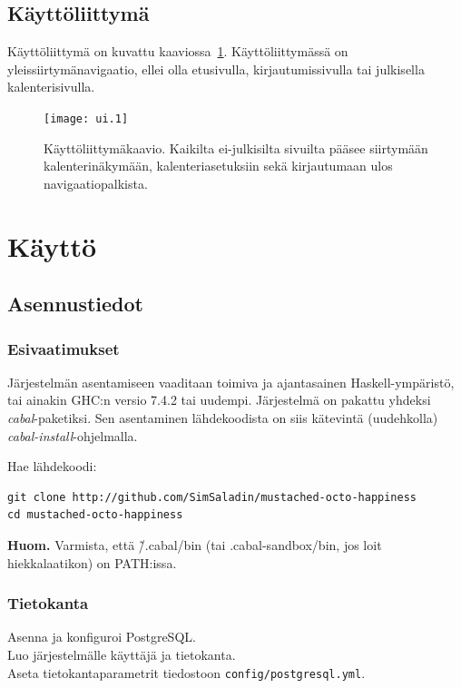 \documentclass[a4paper,12pt]{report}
\begin{document}
\section{Käyttöliittymä}
Käyttöliittymä on kuvattu kaaviossa~\ref{graph_ui}. Käyttöliittymässä on
yleissiirtymänavigaatio, ellei olla etusivulla, kirjautumissivulla tai
julkisella kalenterisivulla.

\begin{figure}[ht]
   \centering
   \texttt{[image: ui.1]}
   \caption{Käyttöliittymäkaavio. Kaikilta ei-julkisilta sivuilta pääsee
   siirtymään kalenterinäkymään, kalenteriasetuksiin sekä kirjautumaan ulos
   navigaatiopalkista.}
   \label{graph_ui}
\end{figure}

\chapter{Käyttö}
\section{Asennustiedot}

\subsection{Esivaatimukset}

Järjestelmän asentamiseen vaaditaan toimiva ja ajantasainen Haskell-ympäristö,
tai ainakin GHC:n versio 7.4.2 tai uudempi.  Järjestelmä on pakattu yhdeksi
\emph{cabal}-\-paketiksi. Sen asentaminen lähdekoodista on siis kätevintä
(uudehkolla) \emph{cabal-install}-ohjelmalla.

Hae lähdekoodi:
\begin{verbatim}
git clone http://github.com/SimSaladin/mustached-octo-happiness
cd mustached-octo-happiness
\end{verbatim}

\textbf{Huom.} Varmista, että \~/.cabal/bin (tai .cabal-sandbox/bin, jos loit
hiekkalaatikon) on PATH:issa.

\subsection{Tietokanta}

Asenna ja konfiguroi PostgreSQL.
\\
Luo järjestelmälle käyttäjä ja tietokanta.
\\
Aseta tietokantaparametrit tiedostoon \texttt{config/postgresql.yml}.
\end{document}
